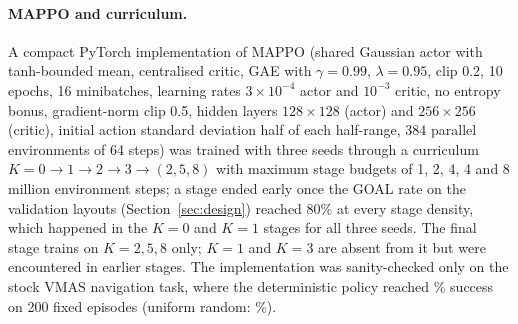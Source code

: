\documentclass[11pt]{article}
\begin{document}
\paragraph{MAPPO and curriculum.} A compact PyTorch implementation of MAPPO \cite{yu2022mappo} (shared Gaussian actor with tanh-bounded
mean, centralised critic, GAE with $\gamma=0.99$, $\lambda=0.95$, clip 0.2, 10 epochs, 16 minibatches,
learning rates $3\times10^{-4}$ actor and $10^{-3}$ critic, no entropy bonus, gradient-norm clip 0.5,
hidden layers $128\times128$ (actor) and $256\times256$ (critic), initial action standard deviation half
of each half-range, 384 parallel environments of 64 steps) was
trained with three seeds through a curriculum $K=0\to1\to2\to3\to(2,5,8)$ with maximum stage budgets of 1, 2,
4, 4 and 8 million environment steps; a stage ended early once the GOAL rate on the validation layouts (Section~\ref{sec:design})
reached 80\% at every stage density, which happened in the $K=0$ and $K=1$ stages for all three seeds.
The final stage trains on $K=2,5,8$ only; $K=1$ and $K=3$ are absent from it but were encountered
in earlier stages. The implementation was sanity-checked only on the stock VMAS
navigation task, where the deterministic policy reached \MappoNavSuccess\% success on 200 fixed
episodes (uniform random: \MappoNavRandom\%).
\end{document}
